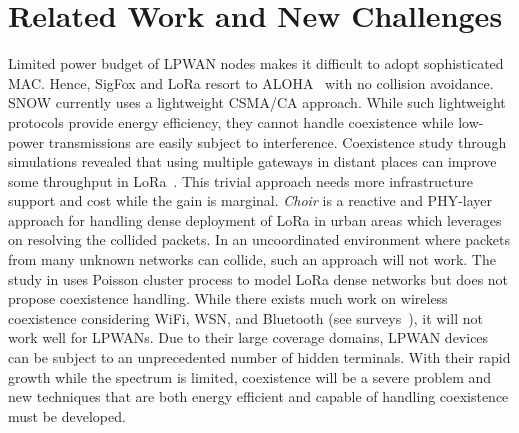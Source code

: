 

 
 \section{Related Work and New Challenges} 
Limited power budget of LPWAN nodes makes it difficult to adopt sophisticated MAC.   
Hence, SigFox and LoRa resort to ALOHA~\cite{tanenbaum} with no collision avoidance.  SNOW currently uses a lightweight CSMA/CA approach. While such lightweight protocols provide energy efficiency, they cannot handle coexistence while low-power transmissions are easily subject to interference.  Coexistence study through simulations revealed that using multiple gateways in distant places can improve some throughput in LoRa~\cite{voigt2016mitigating}. This trivial approach needs more infrastructure support and cost while the gain is marginal. {\slshape Choir} \cite{Choir} is a reactive and PHY-layer approach for handling dense deployment of LoRa in urban areas which leverages on resolving the collided packets. In an uncoordinated environment where packets from many unknown networks can collide, such an approach will not work. The study in \cite{ICC_coexistence}  uses Poisson cluster process to model LoRa dense networks but does not propose coexistence handling. 
While there exists much work on wireless coexistence considering WiFi, WSN, and Bluetooth (see  surveys~\cite{survey802154, coexistence_survey, coexistence_24}), it will not work well for LPWANs. Due to their large coverage domains, LPWAN devices can be subject to an unprecedented number of hidden terminals. 
With their rapid growth while the spectrum is limited, coexistence will be a severe problem and new techniques that are both energy efficient and capable of handling coexistence must be developed. 
